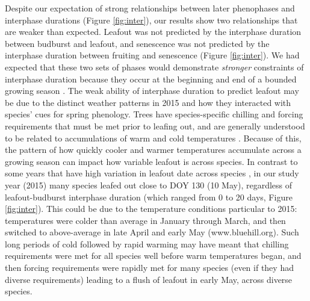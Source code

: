 \documentclass{article}
\begin{document}
\par Despite our expectation of strong relationships between later phenophases and interphase durations (Figure \ref{fig:inter}), our results show two relationships that are weaker than expected. Leafout was not predicted by the interphase duration between budburst and leafout, and senescence was not predicted by the interphase duration between fruiting and senescence (Figure \ref{fig:inter}). We had expected that these two sets of phases would demonstrate \textit{stronger} constraints of interphase duration because they occur at the beginning and end of a bounded growing season \citep{letten2013}. The weak ability of interphase duration to predict leafout may be due to the distinct weather patterns in 2015 and how they interacted with species' cues for spring phenology. Trees have species-specific chilling and forcing requirements that must be met prior to leafing out, and are generally understood to be related to accumulations of warm and cold temperatures \citep[e.g.,][]{schwartz2010,chuine2010,clark2014b}. Because of this, the pattern of how quickly cooler and warmer temperatures accumulate across a growing season can impact how variable leafout is across species. In contrast to some years that have high variation in leafout date across species \citep{lechowicz1994}, in our study year (2015) many species leafed out close to DOY 130 (10 May), regardless of leafout-budburst interphase duration (which ranged from 0 to 20 days, Figure \ref{fig:inter}). This could be due to the temperature conditions particular to 2015: temperatures were colder than average in January through March, and then switched to above-average in late April and early May (www.bluehill.org). Such long periods of cold followed by rapid warming may have meant that chilling requirements were met for all species well before warm temperatures began, and then forcing requirements were rapidly met for many species (even if they had diverse requirements) leading to a flush of leafout in early May, across diverse species. 
\end{document}
